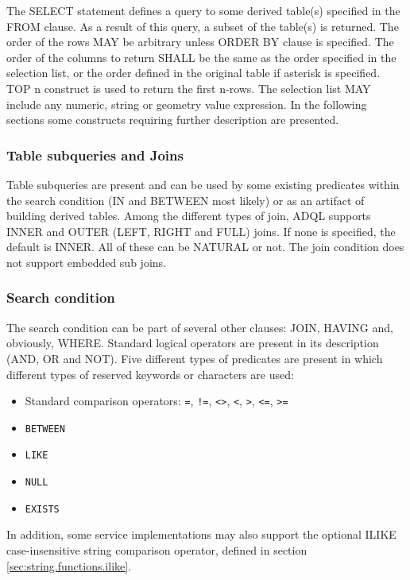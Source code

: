 \documentclass[11pt,a4paper]{ivoa}
\begin{document}
The SELECT statement defines a query to some derived table(s) specified
in the FROM clause. As a result of this query, a subset of the table(s)
is returned. The order of the rows MAY be arbitrary unless ORDER BY clause
is specified. The order of the columns to return SHALL be the same as the
order specified in the selection list, or the order defined in the original
table if asterisk is specified. TOP n construct is used to return the first
n-rows. The selection list MAY include any numeric, string or geometry value
expression. In the following sections some constructs requiring further
description are presented.

\subsubsection{Table subqueries and Joins}
\label{sec:subqueries}

Table subqueries are present and can be used by some existing predicates
within the search condition (IN and BETWEEN most likely) or as an artifact
of building derived tables. Among the different types of join, ADQL supports
INNER and OUTER (LEFT, RIGHT and FULL) joins. If none is specified, the
default is INNER. All of these can be NATURAL or not. The join condition
does not support embedded sub joins.

\subsubsection{Search condition}
\label{sec:search}

The search condition can be part of several other clauses: JOIN, HAVING and,
obviously, WHERE. Standard logical operators are present in its description
(AND, OR and NOT). Five different types of predicates are present in which
different types of reserved keywords or characters are used:

\begin{itemize}
    \item Standard comparison operators: \verb:=:, \verb:!=:, \verb:<>:, \verb:<:, \verb:>:, \verb:<=:, \verb:>=:
    \item \verb:BETWEEN:
    \item \verb:LIKE:
    \item \verb:NULL:
    \item \verb:EXISTS:
\end{itemize}

In addition, some service implementations may also support the optional
ILIKE case-insensitive string comparison operator, defined in section \ref{sec:string.functions.ilike}.
\end{document}
